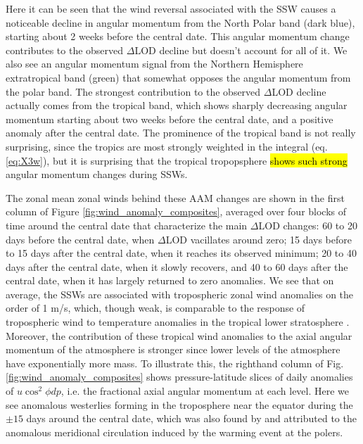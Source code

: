 \documentclass[draft,jgrga]{agutex}
\begin{document}
\begin{article}
Here it can be seen that the wind reversal associated with the SSW causes a noticeable decline in angular momentum from the North Polar band  {(dark blue)}, starting about 2 weeks before the central date.
 {This angular momentum change contributes to the observed $\Delta$LOD decline but doesn't account for all of it.}
 {We also see an  angular momentum signal from the Northern Hemisphere extratropical band (green) that somewhat opposes the angular momentum from the polar band.}
 {The strongest contribution to the observed $\Delta$LOD decline actually comes from the tropical band, which shows sharply decreasing angular momentum starting about two weeks before the central date, and a positive anomaly after the central date.
The prominence of the tropical band is not really surprising, since the tropics are most strongly weighted in the integral} (eq. \ref{eq:X3w}),  {but it is surprising that the tropical tropopsphere \hl{shows such strong} angular momentum changes during SSWs.} 

The zonal mean zonal winds behind these AAM changes are shown in  {the first column of} Figure \ref{fig:wind_anomaly_composites}, averaged over four blocks of time around the central date that characterize the main $\Delta$LOD changes:  {60 to 20 days before the central date, when $\Delta$LOD vacillates around zero; 15 days before to 15 days after the central date, when it reaches its observed minimum; 20 to 40 days after the central date, when it slowly recovers, and 40 to 60 days after the central date, when it has largely returned to zero anomalies.}  
 {We see that on average, the SSWs are associated with} tropospheric zonal wind anomalies on the order of 1 m/s, which,  {though weak, is comparable} to the response of tropospheric wind to temperature anomalies in the tropical lower stratosphere \citet{Haigh2005}.
% 
 {Moreover, the contribution of these tropical wind anomalies} to the axial angular momentum of the atmosphere is stronger since lower levels of the atmosphere have exponentially more mass.
To illustrate this, the righthand column of Fig. \ref{fig:wind_anomaly_composites} shows pressure-latitude slices of daily anomalies of $u \cos^2 \phi dp$, i.e. the fractional axial angular momentum at each level.
 {Here we see anomalous westerlies forming in the troposphere near the equator during the $\pm 15$ days around the central date, which was also found by} \citet{kodera2006}  {and attributed to the anomalous meridional circulation induced by the warming event at the polers.}


\end{article}
\end{document}
